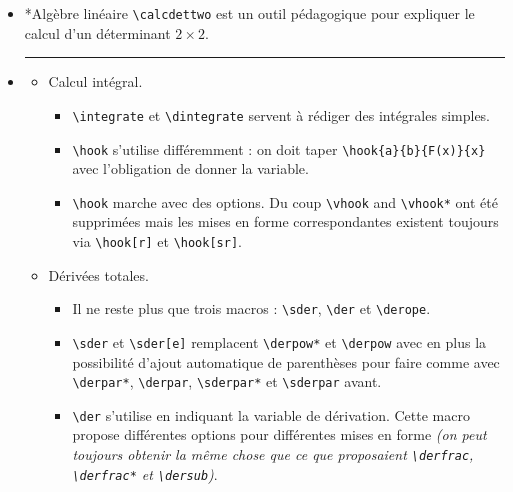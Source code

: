 \documentclass[12pt,a4paper]{book}
\makeatletter
\newcommand\env[1]{\texttt{#1}}
\newcommand\macro[1]{\env{\textbackslash{}#1}}
\theoremstyle{definition}
\newcommand\separation{
	\medskip
	\hfill\rule{0.5\textwidth}{0.75pt}\hfill
	\medskip
}
\newcommand\topic{\@ifstar{\@topic@star}{\@topic@no@star}}
\newcommand\@topic@no@star[1]{%
	\textbf{\textsc{#1}.}%
}
\newcommand\@topic@star[1]{%
	\textbf{\textsc{#1} :}%
}
\makeatother
\begin{document}
{{\begin{description}
\begin{itemize}[itemsep=.5em]
    
    
    
    
        \separation
        \item \topic*{Algèbre linéaire}
              \macro{calcdettwo} est un outil pédagogique pour expliquer le calcul d'un déterminant $2\times2$.
    
    
    
    
        \separation
        \item \topic{Analyse}
        \begin{itemize}[itemsep=.5em]
            \item Calcul intégral.
            
            \begin{itemize}[itemsep=.5em, label=$\rightarrow$]
                \item \macro{integrate} et \macro{dintegrate} servent à rédiger des intégrales simples.
    
                \item \macro{hook} s'utilise différemment : on doit taper \macro{hook\{a\}\{b\}\{F(x)\}\{x\}} avec l'obligation de donner la variable.
                
                \item \macro{hook} marche avec des options.
                      Du coup \macro{vhook} and \macro{vhook*} ont été supprimées mais les mises en forme correspondantes existent toujours via \macro{hook[r]} et \macro{hook[sr]}.
    	    \end{itemize}
    	    
            
            \item Dérivées totales.
            
            \begin{itemize}[itemsep=.5em, label=$\rightarrow$]
                \item Il ne reste plus que trois macros : \macro{sder}, \macro{der} et \macro{derope}.
    
                \item \macro{sder} et \macro{sder[e]} remplacent \macro{derpow*} et \macro{derpow} avec en plus la possibilité d'ajout automatique de parenthèses pour faire comme avec \macro{derpar*}, \macro{derpar}, \macro{sderpar*} et \macro{sderpar} avant.
    
    
                \item \macro{der} s'utilise en indiquant la variable de dérivation. Cette macro propose différentes options pour différentes mises en forme 
                      \emph{(on peut toujours obtenir la même chose que ce que proposaient \macro{derfrac}, \macro{derfrac*} et \macro{dersub})}.
    

\end{itemize}
\end{itemize}
\end{itemize}
\end{description}}}
\end{document}
